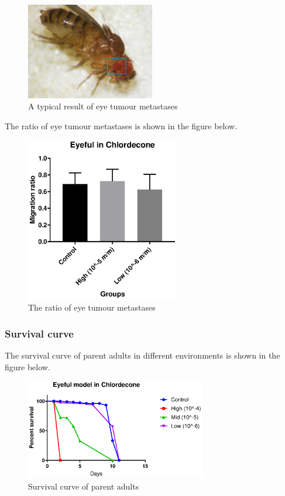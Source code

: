 \begin{figure}[H]
    \centering
    \includegraphics[width=0.5\textwidth,angle=0]{image/Eye.jpg}
    \caption{A typical result of eye tumour metastases}
    \label{Eyef}
\end{figure}

The ratio of eye tumour metastases is shown in the figure below.
\begin{figure}[H]
    \centering
    \includegraphics[width=0.6\textwidth,angle=0]{image/Data1.eps}
    \caption{The ratio of eye tumour metastases}
    \label{Eye}
\end{figure}



\subsubsection{Survival curve}
The survival curve of parent adults in different environments is shown in the figure below.
\begin{figure}[H]
    \centering
    \includegraphics[width=0.7\textwidth,angle=0]{image/Data3.eps}
    \caption{Survival curve of parent adults}
    \label{D3}
\end{figure}




